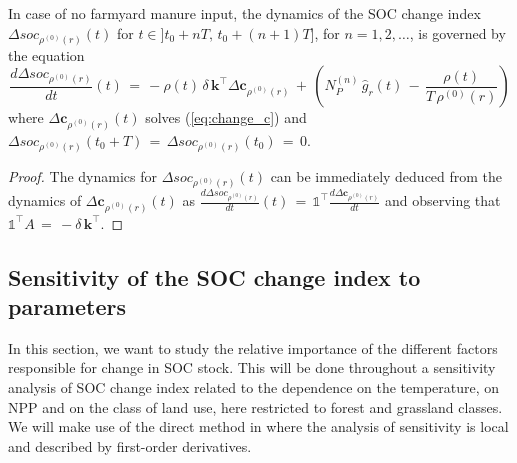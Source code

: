 \begin{corollary}\label{thm:change_s}
In case of no farmyard manure  input, the dynamics of the SOC change index 
$\Delta soc_{\rho^{(0)}(r)}(t)$
for  $t\in]t_0+nT,\,t_0+(n+1)T]$, for $n=1, 2, \dots$,
is governed by the equation
\begin{equation}\label{eq:change_s}
   \displaystyle   \frac{d \Delta soc_{\rho^{(0)}(r)}}{dt} (t)\, =\,     -\rho(t) \, \delta \,\mathbf{k}^\intercal \Delta \mathbf{c}_{\rho^{(0)}(r)}\, +\, \left( N_P^{(n)} \, \hat g_r(t)\,-\, \displaystyle \frac{\rho(t)}{T\,\rho^{(0)}(r)}  \right)
\end{equation}
where $\Delta \mathbf{c}_{\rho^{(0)}(r)}(t)$ solves (\ref{eq:change_c}) and  $\Delta soc_{\rho^{(0)}(r)}(t_0+T)\, =\, \Delta soc_{\rho^{(0)}(r)}(t_0)\,=\, 0$.
\end{corollary}
\begin{proof}
The dynamics for $\Delta soc_{\rho^{(0)}(r)}(t)$ can be immediately deduced from the dynamics of $\Delta \mathbf{c}_{\rho^{(0)}(r)}(t)$ as  
$
\displaystyle   \frac{d \Delta soc_{\rho^{(0)}(r)}}{dt} (t)\, =\, \mathds{1}^\intercal \displaystyle \frac{d \Delta \mathbf{c}_{\rho^{(0)}(r)}}{dt}$ and observing that $\mathds{1}^\intercal A\, =\, -\delta\, \mathbf{k}^\intercal$. 
\end{proof}





\subsection{Sensitivity of the SOC change index to parameters}


\noindent In this section, we want to study  the relative importance of the different factors responsible for change in SOC stock. This will be done throughout a sensitivity analysis of SOC change index related to the dependence  on the temperature, on NPP and on the class of land use, here restricted to  forest and grassland classes. We will make use of the direct method in  \cite{dickinson1976sensitivity} where the analysis of  sensitivity is local and described by  first-order derivatives.


